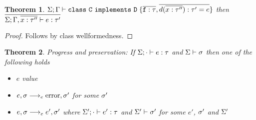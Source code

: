 \documentclass{report}
\newtheorem{thm}{Theorem}
\begin{document}
\begin{thm}$\GSdash \CLASS \C{\xt{D}}{\bar{\f:\t},\bar{\MDEF d{\bar{x:\t''}}{\t'}e}}$ then $\bar{\Sigma;\Gamma,\bar{x:\t''} \vdash e : \t'}$\end{thm}
\begin{proof}
Follows by class wellformedness.
\end{proof}

\begin{thm} Progress and preservation: If $\S;\cdot \vdash e : \t$ and $\S \vdash \s$ then one of the following holds
\begin{itemize}
\item $e$ value
\item $e,\s \ereduce \error,\s'$ for some $\s'$
\item $e,\s \ereduce e',\s'$ where $\S';\cdot \vdash e' : \t$ and $\S' \vdash \s'$ for some $e'$, $\s'$ and $\S'$
\end{itemize}
\end{thm}
\end{document}
